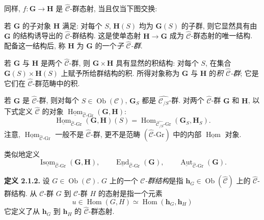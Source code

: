 同样, \(f:\mathbf G\to\mathbf H\) 是 \(\widehat{\mathscr C}\)-群态射, 当且仅当下图交换:

\begin{center}
  
\end{center}

若 \(\mathbf G\) 的子对象 \(\mathbf H\) 满足: 对每个 \(S\), \(\mathbf H(S)\)
均为 \(\mathbf G(S)\) 的子群, 则它显然具有由 \(\mathbf G\) 的结构诱导出的
\(\widehat{\mathscr C}\)-群结构. 这是使单态射 \(\mathbf H\to\mathbf G\) 成为
\(\widehat{\mathscr C}\)-群态射的唯一结构. 配备这一结构后, 称 \(\mathbf H\)
为 \(\mathbf G\) 的一个\emph{子 \(\widehat{\mathscr C}\)-群}.

若 \(\mathbf G\) 与 \(\mathbf H\) 是两个 \(\widehat{\mathscr C}\)-群, 则
\(\mathbf G\times\mathbf H\) 具有显然的积结构: 对每个 \(S\), 在集合
\(\mathbf G(S)\times\mathbf H(S)\) 上赋予所给群结构的积. 所得对象称为
\(\mathbf G\) 与 \(\mathbf H\) 的\emph{积 \(\widehat{\mathscr C}\)-群};
它是它们在 \(\widehat{\mathscr C}\)-群范畴中的积.

若 \(\mathbf G\) 是 \(\widehat{\mathscr C}\)-群, 则对每个
\(S\in\operatorname{Ob}(\mathscr C)\), \(\mathbf G_S\) 都是
\(\widehat{\mathscr C_{/S}}\)-群. 对两个 \(\widehat{\mathscr C}\)-群
\(\mathbf G\) 和 \(\mathbf H\), 以下式定义 \(\widehat{\mathscr C}\) 的对象
\(\underline{\operatorname{Hom}}_{
  \widehat{\mathscr C}\text{-}\mathrm{Gr}}(\mathbf G,\mathbf H)\):
\[
  \underline{\operatorname{Hom}}_{
    \widehat{\mathscr C}\text{-}\mathrm{Gr}}(\mathbf G,\mathbf H)(S)
  =
  \operatorname{Hom}_{
    \widehat{\mathscr C_{/S}}\text{-}\mathrm{Gr}}
    (\mathbf G_S,\mathbf H_S).
\]
注意, \(\underline{\operatorname{Hom}}_{
  \widehat{\mathscr C}\text{-}\mathrm{Gr}}\) 一般不是
\(\widehat{\mathscr C}\)-群, 更不是范畴 \((\widehat{\mathscr C}\text{-}\mathrm{Gr})\)
中的内部 \(\underline{\operatorname{Hom}}\) 对象.

类似地定义
\[
  \underline{\operatorname{Isom}}_{
    \widehat{\mathscr C}\text{-}\mathrm{Gr}}(\mathbf G,\mathbf H),
  \qquad
  \underline{\operatorname{End}}_{
    \widehat{\mathscr C}\text{-}\mathrm{Gr}}(\mathbf G),
  \qquad
  \underline{\operatorname{Aut}}_{
    \widehat{\mathscr C}\text{-}\mathrm{Gr}}(\mathbf G).
\]

\medskip
\noindent{}\textbf{定义 2.1.2.}
设 \(G\in\operatorname{Ob}(\mathscr C)\). \(G\) 上的一个
\emph{\(\mathscr C\)-群结构}是指
\(\mathbf h_G\in\operatorname{Ob}(\widehat{\mathscr C})\) 上的
\(\widehat{\mathscr C}\)-群结构. 从 \(\mathscr C\)-群 \(G\) 到
\(\mathscr C\)-群 \(H\) 的态射是指一个元素
\[
  u\in\operatorname{Hom}(G,H)
  \simeq\operatorname{Hom}(\mathbf h_G,\mathbf h_H)
\]
它定义了从 \(\mathbf h_G\) 到 \(\mathbf h_H\) 的
\(\widehat{\mathscr C}\)-群态射.

